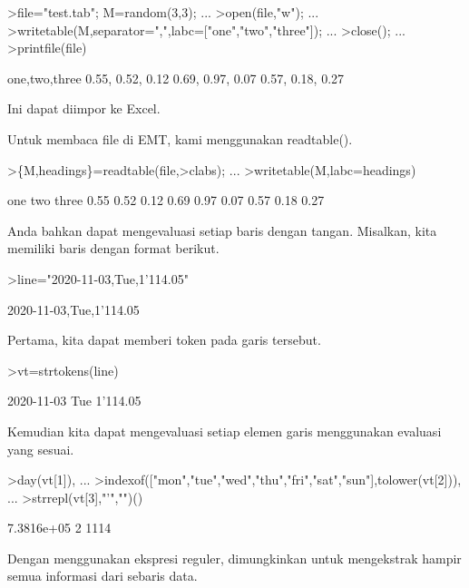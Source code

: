 \documentclass[a4paper,10pt]{article}
\begin{document}
\begin{eulernotebook}
\begin{eulercomment}
\begin{eulercomment}
\begin{eulercomment}
\begin{eulercomment}
\begin{eulercomment}
\begin{eulercomment}
\begin{eulercomment}
\begin{eulercomment}
\begin{eulerprompt}
>file="test.tab"; M=random(3,3);  ...
>open(file,"w");  ...
>writetable(M,separator=",",labc=["one","two","three"]);  ...
>close(); ...
>printfile(file)
\end{eulerprompt}
\begin{euleroutput}
  one,two,three
        0.55,      0.52,      0.12
        0.69,      0.97,      0.07
        0.57,      0.18,      0.27
\end{euleroutput}
\begin{eulercomment}
Ini dapat diimpor ke Excel.

Untuk membaca file di EMT, kami menggunakan readtable().
\end{eulercomment}
\begin{eulerprompt}
>\{M,headings\}=readtable(file,>clabs); ...
>writetable(M,labc=headings)
\end{eulerprompt}
\begin{euleroutput}
         one       two     three
        0.55      0.52      0.12
        0.69      0.97      0.07
        0.57      0.18      0.27
\end{euleroutput}
\begin{eulercomment}
Anda bahkan dapat mengevaluasi setiap baris dengan tangan. Misalkan,
kita memiliki baris dengan format berikut.
\end{eulercomment}
\begin{eulerprompt}
>line="2020-11-03,Tue,1'114.05"
\end{eulerprompt}
\begin{euleroutput}
  2020-11-03,Tue,1'114.05
\end{euleroutput}
\begin{eulercomment}
Pertama, kita dapat memberi token pada garis tersebut.
\end{eulercomment}
\begin{eulerprompt}
>vt=strtokens(line)
\end{eulerprompt}
\begin{euleroutput}
  2020-11-03
  Tue
  1'114.05
\end{euleroutput}
\begin{eulercomment}
Kemudian kita dapat mengevaluasi setiap elemen garis menggunakan
evaluasi yang sesuai.
\end{eulercomment}
\begin{eulerprompt}
>day(vt[1]),  ...
>indexof(["mon","tue","wed","thu","fri","sat","sun"],tolower(vt[2])),  ...
>strrepl(vt[3],"'","")()
\end{eulerprompt}
\begin{euleroutput}
  7.3816e+05
  2
  1114
\end{euleroutput}
\begin{eulercomment}
Dengan menggunakan ekspresi reguler, dimungkinkan untuk mengekstrak
hampir semua informasi dari sebaris data.


\end{eulercomment}
\end{eulercomment}
\end{eulercomment}
\end{eulercomment}
\end{eulercomment}
\end{eulercomment}
\end{eulercomment}
\end{eulercomment}
\end{eulercomment}
\end{eulernotebook}
\end{document}
